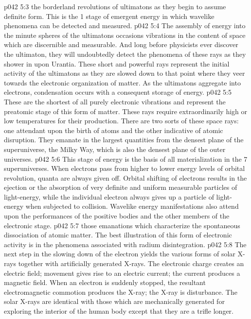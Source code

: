 \vs p042 5:3 \bibnobreakspace {} the borderland revolutions of ultimatons as they begin to assume definite form. This is the 1 stage of emergent energy in which wavelike phenomena can be detected and measured.
\vs p042 5:4 \bibnobreakspace {} The assembly of energy into the minute spheres of the ultimatons occasions vibrations in the content of space which are discernible and measurable. And long before physicists ever discover the ultimaton, they will undoubtedly detect the phenomena of these rays as they shower in upon Urantia. These short and powerful rays represent the initial activity of the ultimatons as they are slowed down to that point where they veer towards the electronic organization of matter. As the ultimatons aggregate into electrons, condensation occurs with a consequent storage of energy.
\vs p042 5:5 \bibnobreakspace {} These are the shortest of all purely electronic vibrations and represent the preatomic stage of this form of matter. These rays require extraordinarily high or low temperatures for their production. There are two sorts of these space rays: one attendant upon the birth of atoms and the other indicative of atomic disruption. They emanate in the largest quantities from the densest plane of the superuniverse, the Milky Way, which is also the densest plane of the outer universes.
\vs p042 5:6 \bibnobreakspace {} This stage of energy is the basis of all materialization in the 7 superuniverses. When electrons pass from higher to lower energy levels of orbital revolution, quanta are always given off. Orbital shifting of electrons results in the ejection or the absorption of very definite and uniform measurable particles of light\hyp{}energy, while the individual electron always gives up a particle of light\hyp{}energy when subjected to collision. Wavelike energy manifestations also attend upon the performances of the positive bodies and the other members of the electronic stage.
\vs p042 5:7 \bibnobreakspace {} those emanations which characterize the spontaneous dissociation of atomic matter. The best illustration of this form of electronic activity is in the phenomena associated with radium disintegration.
\vs p042 5:8 \bibnobreakspace {} The next step in the slowing down of the electron yields the various forms of solar X\hyp{}rays together with artificially generated X\hyp{}rays. The electronic charge creates an electric field; movement gives rise to an electric current; the current produces a magnetic field. When an electron is suddenly stopped, the resultant electromagnetic commotion produces the X\hyp{}ray; the X\hyp{}ray is  disturbance. The solar X\hyp{}rays are identical with those which are mechanically generated for exploring the interior of the human body except that they are a trifle longer.
